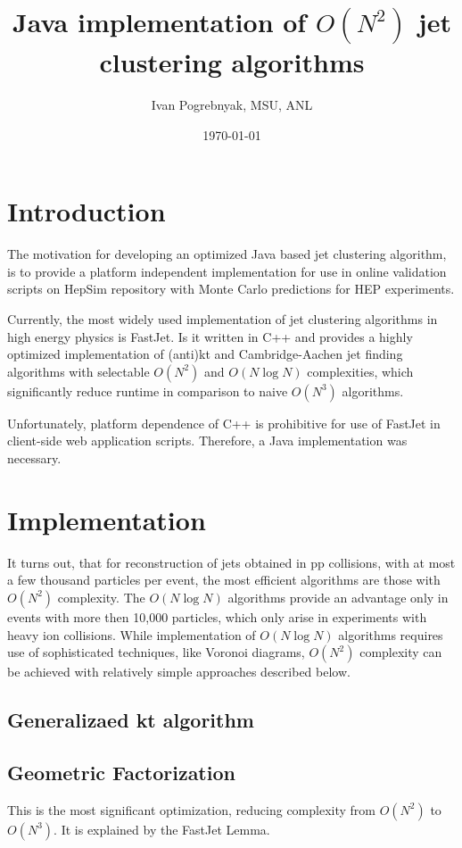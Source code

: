 \documentclass[12pt]{article}
\title{Java implementation of $O(N^2)$ jet clustering algorithms}
\author{Ivan Pogrebnyak, MSU, ANL}
\date{\today}
\begin{document}


\section{Introduction}
The motivation for developing an optimized Java based jet clustering algorithm, is to provide a platform independent implementation for use in online validation scripts on HepSim\cite{HepSim} repository with Monte Carlo predictions for HEP experiments.

Currently, the most widely used implementation of jet clustering algorithms in high energy physics is FastJet\cite{fastjet_man}. Is it written in C++ and provides a highly optimized implementation of (anti)kt and Cambridge-Aachen jet finding algorithms with selectable $O(N^2)$ and $O(N\log N)$ complexities, which significantly reduce runtime in comparison to naive $O(N^3)$ algorithms\cite{fastjet_n3}.

Unfortunately, platform dependence of C++ is prohibitive for use of FastJet in client-side web application  scripts. Therefore, a Java implementation was necessary.

\section{Implementation}

It turns out, that for reconstruction of jets obtained in pp collisions, with at most a few thousand particles per event, the most efficient algorithms are those with $O(N^2)$ complexity.
The $O(N\log N)$ algorithms provide an advantage only in events with more then 10,000 particles, which only arise in experiments with heavy ion collisions\cite{fastjet_n3,fastjet_unpub}. While implementation of $O(N\log N)$ algorithms requires use of sophisticated techniques, like Voronoi diagrams\cite{Aurenhammer}, $O(N^2)$ complexity can be achieved with relatively simple approaches described below.

\subsection{Generalizaed kt algorithm}

\subsection{Geometric Factorization}
This is the most significant optimization, reducing complexity from $O(N^2)$ to $O(N^3)$.
It is explained by the FastJet Lemma\cite{fastjet_n3}.
\end{document}
